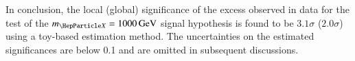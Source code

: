 In conclusion, the local (global) significance of the excess observed in data
for the test of the $\mX = \SI{1000}{\GeV}$ signal hypothesis is found to be
$3.1 \sigma$ ($2.0 \sigma$) using a toy-based estimation method. The
uncertainties on the estimated significances are below \num{0.1} and are omitted
in subsequent discussions.


